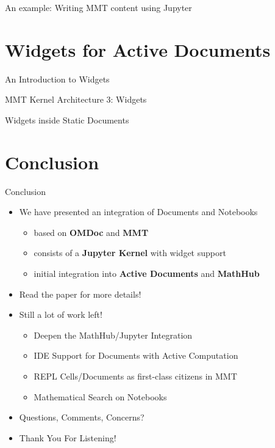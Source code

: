 \documentclass{beamer}
\begin{document}
    \begin{frame}{An example: Writing MMT content using Jupyter}
    \end{frame}

    \section{Widgets for Active Documents}

    \begin{frame}{An Introduction to Widgets}
    \end{frame}

    \begin{frame}{MMT Kernel Architecture 3: Widgets}
    \end{frame}

    \begin{frame}{Widgets inside Static Documents}
    \end{frame}


    \section{Conclusion}

    \begin{frame}{Conclusion}
        \begin{itemize}
            \item We have presented an integration of Documents and Notebooks
            \begin{itemize}
                \item based on \textbf{OMDoc} and \textbf{MMT}
                \item consists of a \textbf{Jupyter Kernel} with widget support
                \item initial integration into \textbf{Active Documents} and \textbf{MathHub}
            \end{itemize}

            \item Read the paper for more details!

            \item Still a lot of work left!
            \begin{itemize}
                \item Deepen the MathHub/Jupyter Integration
                \item IDE Support for Documents with Active Computation
                \item REPL Cells/Documents as first-class citizens in MMT
                \item Mathematical Search on Notebooks
            \end{itemize}

            \item Questions, Comments, Concerns?

            \item Thank You For Listening!

        \end{itemize}
    \end{frame}
\end{document}
